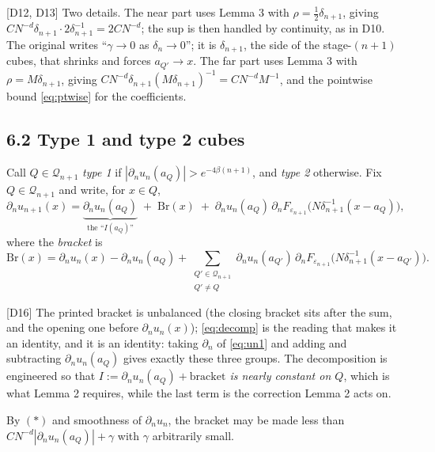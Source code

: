 \documentclass[11pt,reqno]{amsart}
\theoremstyle{plain}
\theoremstyle{definition}
\theoremstyle{plain}
\theoremstyle{definition}
\theoremstyle{remark}
\newcommand{\nd}{\partial_n}
\newcommand{\Ledger}[1]{{\scriptsize\textsf{[#1]}}}
\begin{document}
\begin{expansion}
\Ledger{D12, D13} Two details. The near part uses Lemma 3 with
$\rho=\frac12\delta_{n+1}$, giving $CN^{-d}\delta_{n+1}\cdot2\delta_{n+1}^{-1}
 =2CN^{-d}$; the sup is then handled by continuity, as in D10. The original writes
``$\gamma\to0$ as $\delta_n\to0$''; it is $\delta_{n+1}$, the side of the
stage-$(n{+}1)$ cubes, that shrinks and forces $a_{Q'}\to x$. The far part uses
Lemma 3 with $\rho=M\delta_{n+1}$, giving
$CN^{-d}\delta_{n+1}(M\delta_{n+1})^{-1}=CN^{-d}M^{-1}$, and the pointwise bound
\eqref{eq:ptwise} for the coefficients.
\end{expansion}

\subsection*{6.2 Type 1 and type 2 cubes}

Call $Q\in\mathcal Q_{n+1}$ \emph{type 1} if
$|\nd u_n(a_Q)|>e^{-4\beta(n+1)}$, and \emph{type 2} otherwise. Fix
$Q\in\mathcal Q_{n+1}$ and write, for $x\in Q$,
\begin{equation}\label{eq:decomp}
 \nd u_{n+1}(x)=\underbrace{\nd u_n(a_Q)}_{\text{the ``}I(a_Q)\text{''}}
 \;+\;\mathrm{Br}(x)\;+\;\nd u_n(a_Q)\,
   \nd F_{\varepsilon_{n+1}}\bigl(N\delta_{n+1}^{-1}(x-a_Q)\bigr),
\end{equation}
where the \emph{bracket} is
\begin{equation}\label{eq:bracket}
 \mathrm{Br}(x)=\nd u_n(x)-\nd u_n(a_Q)
  +\!\!\!\sum_{\substack{Q'\in\mathcal Q_{n+1}\\ Q'\ne Q}}\!\!\!\nd u_n(a_{Q'})\,
   \nd F_{\varepsilon_{n+1}}\bigl(N\delta_{n+1}^{-1}(x-a_{Q'})\bigr).
\end{equation}

\begin{expansion}
\Ledger{D16} The printed bracket is unbalanced (the closing bracket sits after the
sum, and the opening one before $\nd u_n(x)$); \eqref{eq:decomp} is the reading that
makes it an identity, and it is an identity: taking $\nd$ of \eqref{eq:un1} and
adding and subtracting $\nd u_n(a_Q)$ gives exactly these three groups. The
decomposition is engineered so that \emph{$I:=\nd u_n(a_Q)+\text{bracket}$ is nearly
constant on $Q$}, which is what Lemma 2 requires, while the last term is the
correction Lemma 2 acts on.
\end{expansion}

By $(*)$ and smoothness of $\nd u_n$, the bracket may be made less than
$CN^{-d}|\nd u_n(a_Q)|+\gamma$ with $\gamma$ arbitrarily small.
\end{document}
